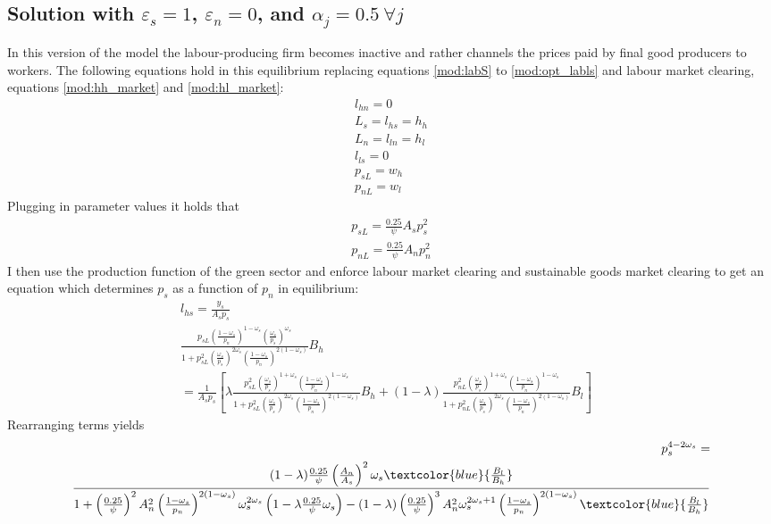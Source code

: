 \subsection{Solution with $\varepsilon_s=1$, $\varepsilon_n=0$, and $\alpha_j=0.5\ \forall j$}
In this version of the model the labour-producing firm becomes inactive and rather channels the prices paid by final good producers to workers.
The following equations hold in this equilibrium replacing equations \ref{mod:labS} to \ref{mod:opt_labls} and labour market clearing, equations \ref{mod:hh_market} and \ref{mod:hl_market}:
\begin{align}
l_{hn}=0\\
L_s=l_{hs}=h_h\\
L_n=l_{ln}=h_l\\
l_{ls}=0\\
p_{sL}=w_h\\
p_{nL}=w_l
\end{align}
Plugging in parameter values it holds that 
\begin{align}
p_{sL}=\frac{0.25}{\psi}A_sp_{s}^2\\
p_{nL}=\frac{0.25}{\psi}A_np_{n}^2
\end{align}
I then use the production function of the green sector and enforce labour market clearing and  sustainable goods market clearing to get an equation which determines $p_s$ as a function of $p_{n}$ in equilibrium:
\begin{align}
l_{hs}=\frac{y_s}{A_sp_s}\\
\frac{p_{sL}\left(\frac{1-\omega_s}{p_n}\right)^{1-\omega_s}\left(\frac{\omega_s}{p_s}\right)^{\omega_s}}{1+p_{sL}^2\left(\frac{\omega_s}{p_s}\right)^{2\omega_s}\left(\frac{1-\omega_s}{p_n}\right)^{2(1-\omega_s)}}B_h&\\ =\frac{1}{A_sp_s}\left[\lambda\frac{p_{sL}^2\left(\frac{\omega_s}{p_s}\right)^{1+\omega_s}\left(\frac{1-\omega_s}{p_n}\right)^{1-\omega_s}}{1+p_{sL}^2\left(\frac{\omega_s}{p_s}\right)^{2\omega_s}\left(\frac{1-\omega_s}{p_n}\right)^{2(1-\omega_s)}}B_h+(1-\lambda)\frac{p_{nL}^2\left(\frac{\omega_s}{p_s}\right)^{1+\omega_s}\left(\frac{1-\omega_s}{p_n}\right)^{1-\omega_s}}{1+p_{nL}^2\left(\frac{\omega_s}{p_s}\right)^{2\omega_s}\left(\frac{1-\omega_s}{p_n}\right)^{2(1-\omega_s)}}B_l\right]
\end{align}
Rearranging terms yields
\begin{align}
	p_s^{4-2\omega_s}=\nonumber \\
	\frac{(1-\lambda)\frac{0.25}{\psi}\left(\frac{A_n}{A_s}\right)^2\omega_s\textcolor{blue}{\frac{B_l}{B_h}}}{1+\left(\frac{0.25}{\psi}\right)^2A_n^2\left(\frac{1-\omega_s}{p_n}\right)^{2(1-\omega_s)}\omega_s^{2\omega_s}\left(1-\lambda\frac{0.25}{\psi}\omega_s\right)-(1-\lambda)\left(\frac{0.25}{\psi}\right)^3A_n^2\omega_s^{2\omega_s+1}\left(\frac{1-\omega_s}{p_n}\right)^{2(1-\omega_s)}\textcolor{blue}{\frac{B_l}{B_h}}}
\end{align}
